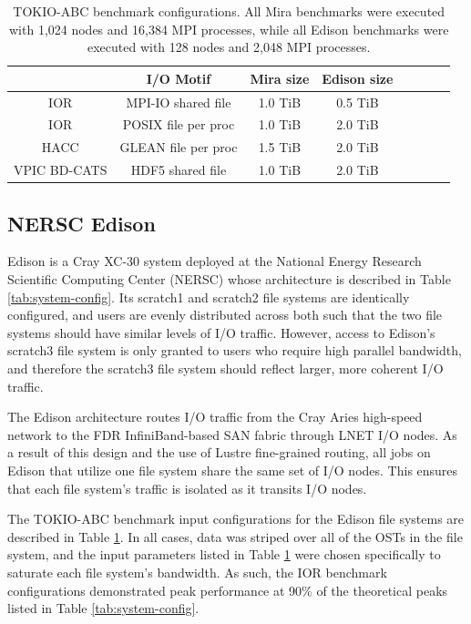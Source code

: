 \begin{table}[h]
\footnotesize
\centering
\begin{tabular}{|c|c|c|c|c|c|c|c|}
\hline
 & \textbf{I/O Motif} & \textbf{Mira size} & \textbf{Edison size} \\
\hline
IOR & MPI-IO shared file & 1.0 TiB & 0.5 TiB\\
\hline
IOR & POSIX file per proc & 1.0 TiB & 2.0 TiB\\
\hline
HACC & GLEAN file per proc & 1.5 TiB & 2.0 TiB \\
\hline
VPIC BD-CATS & HDF5 shared file & 1.0 TiB & 2.0 TiB\\
\hline
\end{tabular}
\caption{TOKIO-ABC benchmark configurations. All Mira benchmarks were
executed with 1,024 nodes and 16,384 MPI processes, while all Edison
benchmarks were executed with 128 nodes and 2,048 MPI processes.}
\label{tab:bench-config}
\normalsize
\vspace{-.4in}
\end{table}

\subsection{NERSC Edison} \label{sec:platforms/edison}

Edison is a Cray XC-30 system deployed at the National Energy Research Scientific Computing Center (NERSC) whose architecture is described in Table \ref{tab:system-config}.
Its scratch1 and scratch2 file systems are identically configured, and users are evenly distributed across both such that the two file systems should have similar levels of I/O traffic.
However, access to Edison's scratch3 file system is only granted to users who require high parallel bandwidth, and therefore the scratch3 file system should reflect larger, more coherent I/O traffic.

The Edison architecture routes I/O traffic from the Cray Aries high-speed network to the FDR InfiniBand-based SAN fabric through LNET I/O nodes.
As a result of this design and the use of Lustre fine-grained routing, all jobs on Edison that utilize one file system share the same set of I/O nodes.
This ensures that each file system's traffic is isolated as it transits I/O nodes.

The TOKIO-ABC benchmark input configurations for the Edison file systems are described in Table \ref{tab:bench-config}.
In all cases, data was striped over all of the OSTs in the file system, and the input parameters listed in Table \ref{tab:bench-config} were chosen specifically to saturate each file system's bandwidth.
As such, the IOR benchmark configurations demonstrated peak performance at 90\% of the theoretical peaks listed in Table \ref{tab:system-config}.

